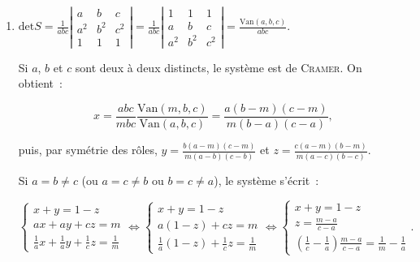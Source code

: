 {{\begin{enumerate}
$$x=\frac{2m^2-m-1}{m^2+1},\;y=3-m\;\mbox{et}\;z=\frac{3m-1}{m^2+1}.$$

La troisième équation fournit alors une condition nécessaire et suffisante de compatibilité~:

\begin{align*}\ensuremath
-m\frac{2m^2-m-1}{m^2+1}&+3-m+m\frac{3m-1}{m^2+1}=-m\\
 &\Leftrightarrow-m(2m^2-m-1)+(3-m)(m^2+1)+m(3m-1)=-m(m^2+1)\\
 &\Leftrightarrow-2m^3+7m^2+3= 0
\end{align*}

Le système est compatible si et seulement si $m$ est l'une des trois racines de l'équation $-2X^3+7X^2+3=0$.

\item  $\mbox{det}S=\frac{1}{abc}\left|
\begin{array}{ccc}
a&b&c\\
a^2&b^2&c^2\\
1&1&1
\end{array}
\right|=\frac{1}{abc}\left|
\begin{array}{ccc}
1&1&1\\
a&b&c\\
a^2&b^2&c^2
\end{array}
\right|=\frac{\mbox{Van}(a,b,c)}{abc}$.

Si $a$, $b$ et $c$ sont deux à deux distincts, le système est de \textsc{Cramer}. On obtient~:

$$x=\frac{abc}{mbc}\frac{\mbox{Van}(m,b,c)}{\mbox{Van}(a,b,c)}=\frac{a(b-m)(c-m)}{m(b-a)(c-a)},$$

puis, par symétrie des rôles, $y=\frac{b(a-m)(c-m)}{m(a-b)(c-b)}$ et $z=\frac{c(a-m)(b-m)}{m(a-c)(b-c)}$.

Si $a=b\neq c$ (ou $a=c\neq b$ ou $b=c\neq a$), le système s'écrit~:

$$\left\{
\begin{array}{l}
x+y=1-z\\
ax+ay+cz=m\\
\frac{1}{a}x+\frac{1}{a}y+\frac{1}{c}z=\frac{1}{m}
\end{array}
\right.\Leftrightarrow\left\{
\begin{array}{l}
x+y=1-z\\
a(1-z)+cz=m\\
\frac{1}{a}(1-z)+\frac{1}{c}z=\frac{1}{m}
\end{array}
\right.\Leftrightarrow\left\{
\begin{array}{l}
x+y=1-z\\
z=\frac{m-a}{c-a}\\
(\frac{1}{c}-\frac{1}{a})\frac{m-a}{c-a}=\frac{1}{m}-\frac{1}{a}
\end{array}
\right..$$


\end{enumerate}}}
